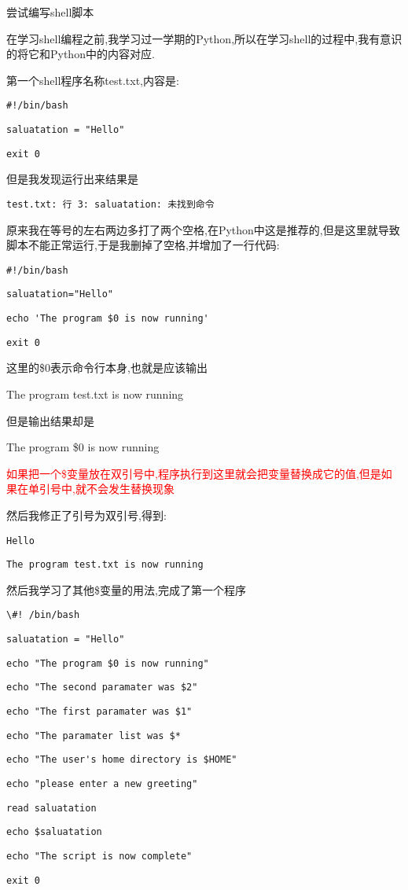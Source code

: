 \documentclass{ctexart}
\begin{document}
\large\centerline{尝试编写shell脚本}
\quad 在学习shell编程之前,我学习过一学期的Python,所以在学习shell的过程中,我有意识的将它和Python中的内容对应.
\par
第一个shell程序名称test.txt,内容是:\par 
\verb|#!/bin/bash|\par
\verb|saluatation = "Hello"|\par
\verb|exit 0|\par
但是我发现运行出来结果是\par \verb|test.txt: 行 3: saluatation: 未找到命令|\par 原来我在等号的左右两边多打了两个空格,在Python中这是推荐的,但是这里就导致脚本不能正常运行,于是我删掉了空格,并增加了一行代码:\par 
\verb|#!/bin/bash|\par
\verb|saluatation="Hello"|\par
\verb|echo 'The program $0 is now running'|\par 
\verb|exit 0|\par 
这里的\$0表示命令行本身,也就是应该输出\par 
The program test.txt is now running \par
但是输出结果却是\par The program \$0 is now running\par 

\textcolor{red}{如果把一个\$变量放在双引号中,程序执行到这里就会把变量替换成它的值,但是如果在单引号中,就不会发生替换现象}\par 

然后我修正了引号为双引号,得到:\par 
\verb|Hello|\par \verb|The program test.txt is now running|\par 
然后我学习了其他\$变量的用法,完成了第一个程序
\par
\verb|\#! /bin/bash|\par 
\verb|saluatation = "Hello"|\par 
\verb|echo "The program $0 is now running"|\par 
\verb|echo "The second paramater was $2"|\par 
\verb|echo "The first paramater was $1"|\par
\verb|echo "The paramater list was $*|\par 
\verb|echo "The user's home directory is $HOME"|\par 
\verb|echo "please enter a new greeting"|\par 
\verb|read saluatation|\par\par 
\verb|echo $saluatation|\par 
\verb|echo "The script is now complete"|\par
\verb|exit 0|
\end{document}
